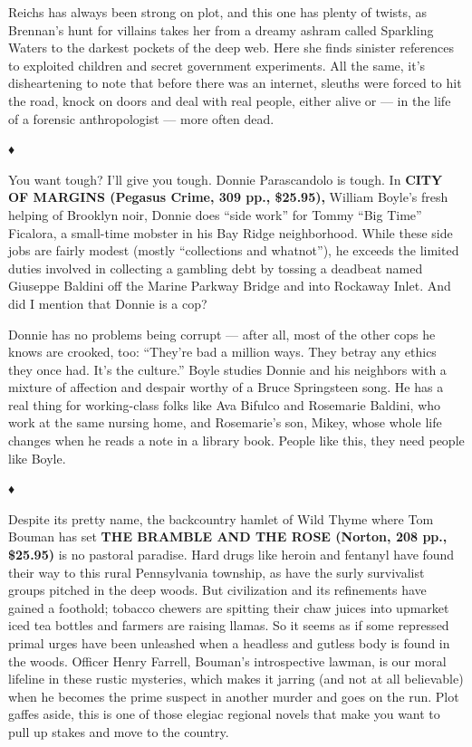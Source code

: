 Reichs has always been strong on plot, and this one has plenty of
twists, as Brennan's hunt for villains takes her from a dreamy ashram
called Sparkling Waters to the darkest pockets of the deep web. Here she
finds sinister references to exploited children and secret government
experiments. All the same, it's disheartening to note that before there
was an internet, sleuths were forced to hit the road, knock on doors and
deal with real people, either alive or --- in the life of a forensic
anthropologist --- more often dead.

♦

You want tough? I'll give you tough. Donnie Parascandolo is tough. In
\textbf{CITY OF MARGINS (Pegasus Crime, 309 pp., \$25.95),} William
Boyle's fresh helping of Brooklyn noir, Donnie does ``side work'' for
Tommy ``Big Time'' Ficalora, a small-time mobster in his Bay Ridge
neighborhood. While these side jobs are fairly modest (mostly
``collections and whatnot''), he exceeds the limited duties involved in
collecting a gambling debt by tossing a deadbeat named Giuseppe Baldini
off the Marine Parkway Bridge and into Rockaway Inlet. And did I mention
that Donnie is a cop?

Donnie has no problems being corrupt --- after all, most of the other
cops he knows are crooked, too: ``They're bad a million ways. They
betray any ethics they once had. It's the culture.'' Boyle studies
Donnie and his neighbors with a mixture of affection and despair worthy
of a Bruce Springsteen song. He has a real thing for working-class folks
like Ava Bifulco and Rosemarie Baldini, who work at the same nursing
home, and Rosemarie's son, Mikey, whose whole life changes when he reads
a note in a library book. People like this, they need people like Boyle.

♦

Despite its pretty name, the backcountry hamlet of Wild Thyme where Tom
Bouman has set \textbf{THE BRAMBLE AND THE ROSE (Norton, 208 pp.,
\$25.95)} is no pastoral paradise. Hard drugs like heroin and fentanyl
have found their way to this rural Pennsylvania township, as have the
surly survivalist groups pitched in the deep woods. But civilization and
its refinements have gained a foothold; tobacco chewers are spitting
their chaw juices into upmarket iced tea bottles and farmers are raising
llamas. So it seems as if some repressed primal urges have been
unleashed when a headless and gutless body is found in the woods.
Officer Henry Farrell, Bouman's introspective lawman, is our moral
lifeline in these rustic mysteries, which makes it jarring (and not at
all believable) when he becomes the prime suspect in another murder and
goes on the run. Plot gaffes aside, this is one of those elegiac
regional novels that make you want to pull up stakes and move to the
country.

